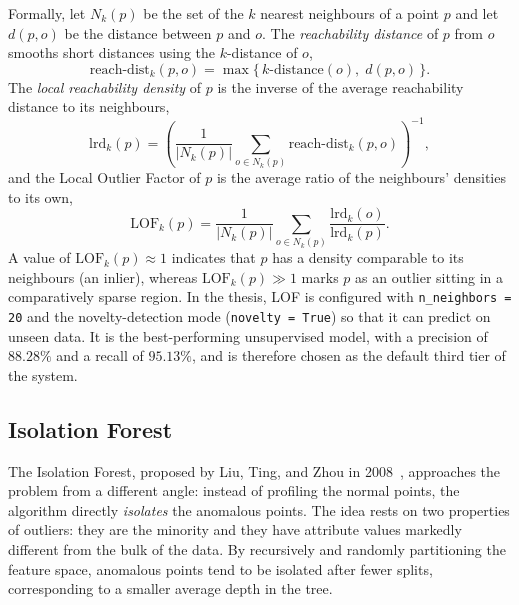 Formally, let $N_k(p)$ be the set of the $k$ nearest neighbours of a point
$p$ and let $d(p,o)$ be the distance between $p$ and $o$. The
\emph{reachability distance} of $p$ from $o$ smooths short distances using
the $k$-distance of $o$,
\begin{equation}
  \text{reach-dist}_k(p,o) = \max\{\, k\text{-distance}(o),\; d(p,o) \,\}.
  \label{eq:reachdist}
\end{equation}
The \emph{local reachability density} of $p$ is the inverse of the average
reachability distance to its neighbours,
\begin{equation}
  \text{lrd}_k(p) = \left( \frac{1}{|N_k(p)|}
  \sum_{o \in N_k(p)} \text{reach-dist}_k(p,o) \right)^{-1},
  \label{eq:lrd}
\end{equation}
and the Local Outlier Factor of $p$ is the average ratio of the neighbours'
densities to its own,
\begin{equation}
  \text{LOF}_k(p) = \frac{1}{|N_k(p)|}
  \sum_{o \in N_k(p)} \frac{\text{lrd}_k(o)}{\text{lrd}_k(p)} .
  \label{eq:lof}
\end{equation}
A value of $\text{LOF}_k(p) \approx 1$ indicates that $p$ has a density
comparable to its neighbours (an inlier), whereas $\text{LOF}_k(p) \gg 1$
marks $p$ as an outlier sitting in a comparatively sparse region. In the
thesis, LOF is
configured with \texttt{n\_neighbors = 20} and the novelty-detection mode
(\texttt{novelty = True}) so that it can predict on unseen data. It is the
best-performing unsupervised model, with a precision of $88.28\%$ and a
recall of $95.13\%$, and is therefore chosen as the default third tier of
the system.

\subsection{Isolation Forest}

The Isolation Forest, proposed by Liu, Ting, and Zhou in
2008~\cite{liu2008}, approaches the problem from a different angle: instead
of profiling the normal points, the algorithm directly \emph{isolates} the
anomalous points. The idea rests on two properties of outliers: they are
the minority and they have attribute values markedly different from the
bulk of the data. By recursively and randomly partitioning the feature
space, anomalous points tend to be isolated after fewer splits,
corresponding to a smaller average depth in the tree.

